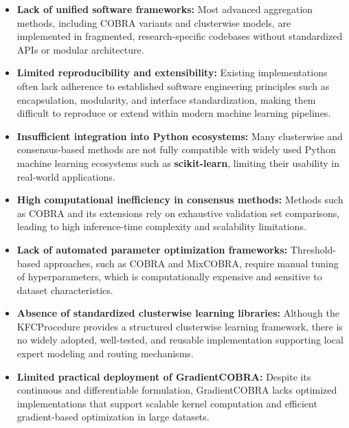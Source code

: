 \begin{itemize}    
    \item \textbf{Lack of unified software frameworks:} Most advanced aggregation methods, including COBRA variants and clusterwise models, are implemented in fragmented, research-specific codebases without standardized APIs or modular architecture.
          
          
    \item \textbf{Limited reproducibility and extensibility:} Existing implementations often lack adherence to established software engineering principles such as encapsulation, modularity, and interface standardization, making them difficult to reproduce or extend within modern machine learning pipelines.
          
    \item \textbf{Insufficient integration into Python ecosystems:} Many clusterwise and consensus-based methods are not fully compatible with widely used Python machine learning ecosystems such as \textbf{scikit-learn}, limiting their usability in real-world applications.
          
    \item \textbf{High computational inefficiency in consensus methods:} Methods such as COBRA and its extensions rely on exhaustive validation set comparisons, leading to high inference-time complexity and scalability limitations.
          
    \item \textbf{Lack of automated parameter optimization frameworks:} Threshold-based approaches, such as COBRA and MixCOBRA, require manual tuning of hyperparameters, which is computationally expensive and sensitive to dataset characteristics.
          
    \item \textbf{Absence of standardized clusterwise learning libraries:} Although the KFCProcedure provides a structured clusterwise learning framework, there is no widely adopted, well-tested, and reusable implementation supporting local expert modeling and routing mechanisms.
          
    \item \textbf{Limited practical deployment of GradientCOBRA:} Despite its continuous and differentiable formulation, GradientCOBRA lacks optimized implementations that support scalable kernel computation and efficient gradient-based optimization in large datasets.
          
          
\end{itemize}

